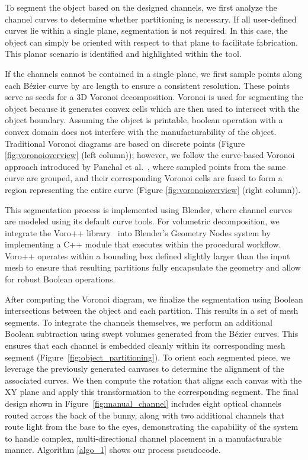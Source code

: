 To segment the object based on the designed channels, we first analyze the channel curves to determine whether partitioning is necessary. If all user-defined curves lie within a single plane, segmentation is not required. In this case, the object can simply be oriented with respect to that plane to facilitate fabrication. This planar scenario is identified and highlighted within the tool.

If the channels cannot be contained in a single plane, we first sample points along each Bézier curve by arc length to ensure a consistent resolution. These points serve as seeds for a 3D Voronoi decomposition. Voronoi is used for segmenting the object because it generates convex cells which are then used to intersect with the object boundary. Assuming the object is printable, boolean operation with a convex domain does not interfere with the manufacturability of the object. Traditional Voronoi diagrams are based on discrete points (Figure \ref{fig:voronoioverview} (left column)); however, we follow the curve-based Voronoi approach introduced by Panchal et al.~\cite{panchal2023curvedspacefillingtilesusing}, where sampled points from the same curve are grouped, and their corresponding Voronoi cells are fused to form a region representing the entire curve (Figure \ref{fig:voronoioverview} (right column)).

This segmentation process is implemented using Blender, where channel curves are modeled using its default curve tools. For volumetric decomposition, we integrate the Voro++ library~\cite{rycroft2009voro} into Blender’s Geometry Nodes system by implementing a C++ module that executes within the procedural workflow. Voro++ operates within a bounding box defined slightly larger than the input mesh to ensure that resulting partitions fully encapsulate the geometry and allow for robust Boolean operations.

After computing the Voronoi diagram, we finalize the segmentation using Boolean intersections between the object and each partition. This results in a set of mesh segments. To integrate the channels themselves, we perform an additional Boolean subtraction using swept volumes generated from the Bézier curves. This ensures that each channel is embedded cleanly within its corresponding mesh segment (Figure~\ref{fig:object_partitioning}). To orient each segmented piece, we leverage the previously generated canvases to determine the alignment of the associated curves. We then compute the rotation that aligns each canvas with the XY plane and apply this transformation to the corresponding segment.
The final design shown in Figure~\ref{fig:manual_channel} includes eight optical channels routed across the back of the bunny, along with two additional channels that route light from the base to the eyes, demonstrating the capability of the system to handle complex, multi-directional channel placement in a manufacturable manner. Algorithm \ref{algo_1} shows our process pseudocode.

